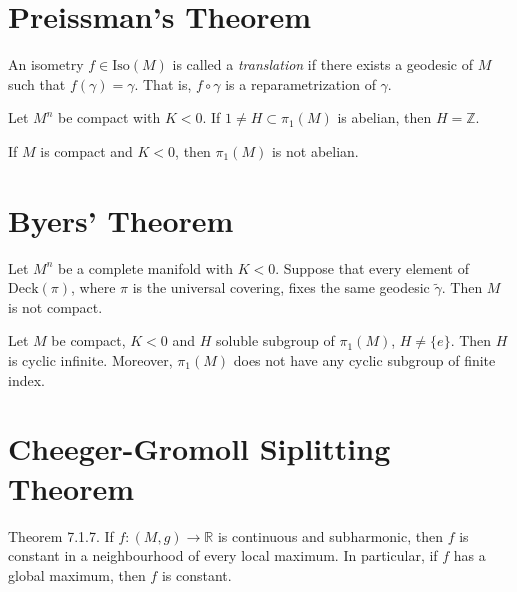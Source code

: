 \documentclass{book}
\begin{document}
\section{Preissman's Theorem}
\label{section-Preissman-theorem}

\begin{definition}
\label{definition-translation}
An isometry $f \in \text{Iso}(M)$ is called a
{\it translation} if there exists
a geodesic of $M$ such that
$f(\gamma)=\gamma$. That is, $f \circ \gamma$
is a
reparametrization of $\gamma$.
\end{definition}

\begin{theorem}[Preissman]
\label{theorem-Preissman}
Let $M^n$ be compact with $K<0$. If $1 \neq
H \subset \pi_1(M)$ is abelian,
then $H=\mathbb{Z}$.
\end{theorem}

\begin{theorem}[Preissman]
\label{theorem-m-compa-k-negat-then-pi1}
If $M$ is compact and $K<0$, then
$\pi_{1}(M)$ is not abelian.
\end{theorem}

\section{Byers' Theorem}
\label{section-Byers-theorem}

\begin{lemma}
\label{lemma-deck-fixes-geode-then-not}
Let $M^n$ be a complete manifold with $K<0$.
Suppose that every element of
$\text{Deck}(\pi)$, where $\pi$ is the
universal covering, fixes the same
 geodesic $\tilde{\gamma}$. Then $M$ is not
 compact.
\end{lemma}

\begin{theorem}[Byers]
\label{theorem-Byers}
Let $M$ be compact, $K<0$ and $H$ soluble
subgroup of $\pi_1(M)$, $H\neq \{e\}$.
Then $H$ is cyclic infinite. Moreover,
$\pi_1(M)$ does not have any cyclic
subgroup of finite index.
\end{theorem}

\section{Cheeger-Gromoll Siplitting Theorem}
\label{section-chegg-gromo-split-theor}

\begin{theorem}
\label{theorem-strong-maximum-principle}
\cite{pet} Theorem 7.1.7. If $f:(M,g) \to
\mathbb{R}$ is continuous and
subharmonic, then $f$ is constant in a
neighbourhood of every local maximum. In
particular, if $f$ has a global maximum, then
$f$ is constant.
\end{theorem}
\end{document}
